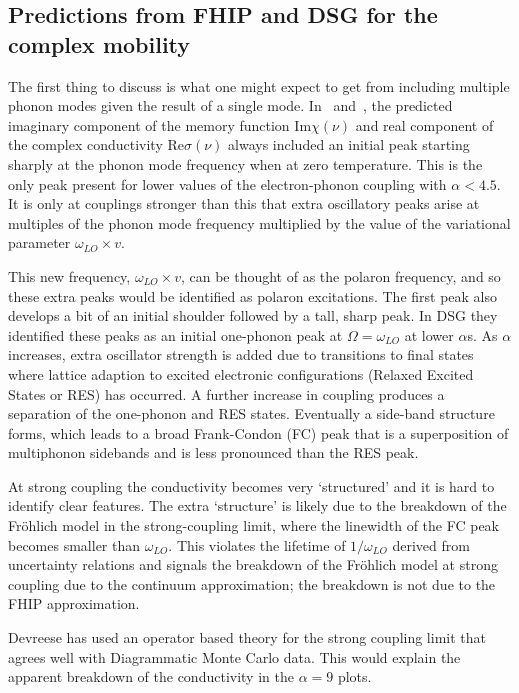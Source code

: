 \subsection{Predictions from FHIP and DSG for the complex mobility}

The first thing to discuss is what one might expect to get from including multiple phonon modes given the result of a single mode. In~\cite{feynman_mobility_1962} and~\cite{devreese_optical_1972}, the predicted imaginary component of the memory function $\text{Im}\chi(\nu)$ and real component of the complex conductivity $\text{Re}\sigma(\nu)$ always included an initial peak starting sharply at the phonon mode frequency when at zero temperature. This is the only peak present for lower values of the electron-phonon coupling with $\alpha < 4.5$. It is only at couplings stronger than this that extra oscillatory peaks arise at multiples of the phonon mode frequency multiplied by the value of the variational parameter $\omega_{LO} \times v$. 

This new frequency, $\omega_{LO} \times v$, can be thought of as the polaron frequency, and so these extra peaks would be identified as polaron excitations. The first peak also develops a bit of an initial shoulder followed by a tall, sharp peak. In DSG they identified these peaks as an initial one-phonon peak at $\Omega = \omega_{LO}$ at lower $\alpha$s. As $\alpha$ increases, extra oscillator strength is added due to transitions to final states where lattice adaption to excited electronic configurations (Relaxed Excited States or RES) has occurred. A further increase in coupling produces a separation of the one-phonon and RES states. Eventually a side-band structure forms, which leads to a broad Frank-Condon (FC) peak that is a superposition of multiphonon sidebands and is less pronounced than the RES peak. 

At strong coupling the conductivity becomes very `structured' and it is hard to identify clear features. The extra `structure' is likely due to the breakdown of the Fr\"ohlich model in the strong-coupling limit, where the linewidth of the FC peak becomes smaller than $\omega_{LO}$. This violates the lifetime of $1 / \omega_{LO}$ derived from uncertainty relations and signals the breakdown of the Fr\"ohlich model at strong coupling due to the continuum approximation; the breakdown is not due to the FHIP approximation. 

Devreese has used an operator based theory \cite{Devreese2001} for the strong coupling limit that agrees well with Diagrammatic Monte Carlo data. This would explain the apparent breakdown of the conductivity in the $\alpha = 9$ plots. 

